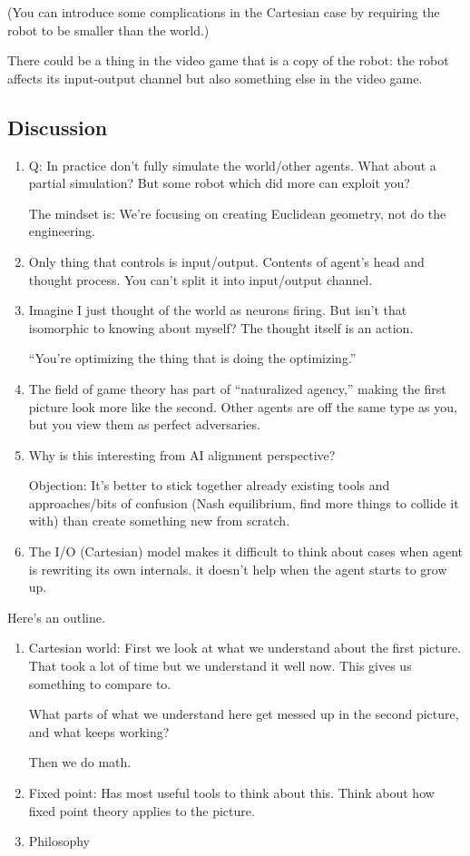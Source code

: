 \documentclass[11pt]{article}
\begin{document}
(You can introduce some complications in the Cartesian case by requiring the robot to be smaller than the world.)

There could be a thing in the video game that is a copy of the robot: the robot affects its input-output channel but also something else in the video game.

\subsection{Discussion}

\begin{enumerate}
\item
Q: In practice don't fully simulate the world/other agents. What about a partial simulation? But some robot which did more can exploit you?

The mindset is: We're focusing on creating Euclidean geometry, not do the engineering.
\item
Only thing that controls is input/output. Contents of agent's head and thought process. You can't split it into input/output channel.
\item
Imagine I just thought of the world as neurons firing.  But isn't that isomorphic to knowing about myself?  The thought itself is an action.

``You're optimizing the thing that is doing the optimizing.''
\item
The field of game theory has part of ``naturalized agency,'' making the first picture look more like the second. Other agents are off the same type as you, but you view them as perfect adversaries. 
\item
Why is this interesting from AI alignment perspective?

Objection: It's better to stick together already existing tools and approaches/bits of confusion (Nash equilibrium, find more things to collide it with) than create something new from scratch.
\item
The I/O (Cartesian) model makes it difficult to think about cases when agent is rewriting its own internals. it doesn't help when the agent starts to grow up.
\end{enumerate}
Here's an outline.
\begin{enumerate}
\item
Cartesian world: 
First we look at what we understand about the first picture. That took a lot of time but we understand it well now. This gives us something to compare to.

What parts of what we understand here get messed up in the second picture, and what keeps working?

Then we do math. 
\item
Fixed point: Has most useful tools to think about this. Think about how fixed point theory applies to the picture.
\item
Philosophy
\end{enumerate}
\end{document}
